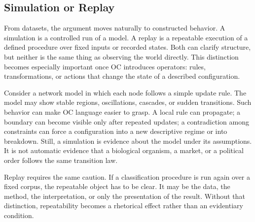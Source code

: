 \documentclass[11pt,a4paper,openany]{book}
\begin{document}
\subsection{Simulation or Replay}
From datasets, the argument moves naturally to constructed behavior. A simulation is a controlled run of a model. A replay is a repeatable execution of a defined procedure over fixed inputs or recorded states. Both can clarify structure, but neither is the same thing as observing the world directly. This distinction becomes especially important once OC introduces operators: rules, transformations, or actions that change the state of a described configuration. \cite{raf_networks,bak_soc}\par
Consider a network model in which each node follows a simple update rule. The model may show stable regions, oscillations, cascades, or sudden transitions. Such behavior can make OC language easier to grasp. A local rule can propagate; a boundary can become visible only after repeated updates; a contradiction among constraints can force a configuration into a new descriptive regime or into breakdown. Still, a simulation is evidence about the model under its assumptions. It is not automatic evidence that a biological organism, a market, or a political order follows the same transition law.\par
Replay requires the same caution. If a classification procedure is run again over a fixed corpus, the repeatable object has to be clear. It may be the data, the method, the interpretation, or only the presentation of the result. Without that distinction, repeatability becomes a rhetorical effect rather than an evidentiary condition.\par
\end{document}
